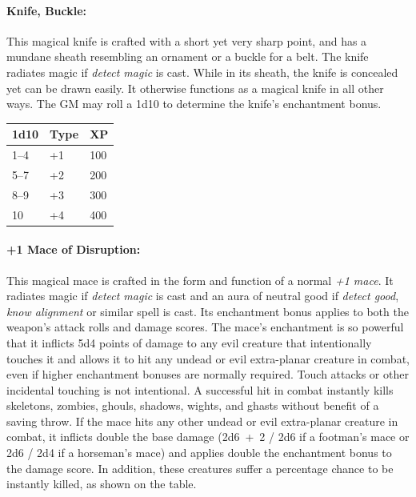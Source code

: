 \begin{multicols}{2}
\paragraph{Knife, Buckle:} This magical knife is crafted with a short yet very sharp point, and has a mundane sheath resembling an ornament or a buckle for a belt.  The knife radiates magic if \textit{detect magic} is cast. While in its sheath, the knife is concealed yet can be drawn easily.  It otherwise functions as a magical knife in all other ways.  The GM may roll a 1d10 to determine the knife's enchantment bonus.
 
\noindent \begin{tabular}{|p{}|p{}|p{}|}
\hline
1d10	& Type	& XP \\
\hline\hline
\rowcolor[gray]{0.9}1--4	& +1	& 100 \\
5--7	& +2	& 200 \\
\rowcolor[gray]{0.9}8--9	& +3	& 300 \\
10	& +4	& 400 \\
\hline
\end{tabular}

\paragraph{+1 Mace of Disruption:} This magical mace is crafted in the form and function of a normal \textit{+1 mace}.  It radiates magic if \textit{detect magic} is cast and an aura of neutral good if \textit{detect good}, \textit{know alignment} or similar spell is cast.  Its enchantment bonus applies to both the weapon's attack rolls and damage scores.  The mace's enchantment is so powerful that it inflicts 5d4 points of damage to any evil creature that intentionally touches it and allows it to hit any undead or evil extra-planar creature in combat, even if higher enchantment bonuses are normally required.  Touch attacks or other incidental touching is not intentional.  A successful hit in combat instantly kills skeletons, zombies, ghouls, shadows, wights, and ghasts without benefit of a saving throw.  If the mace hits any other undead or evil extra-planar creature in combat, it inflicts double the base damage (2d6~+~2 / 2d6 if a footman's mace or 2d6 / 2d4 if a horseman's mace) and applies double the enchantment bonus to the damage score.  In addition, these creatures suffer a percentage chance to be instantly killed, as shown on the table.


\end{multicols}
